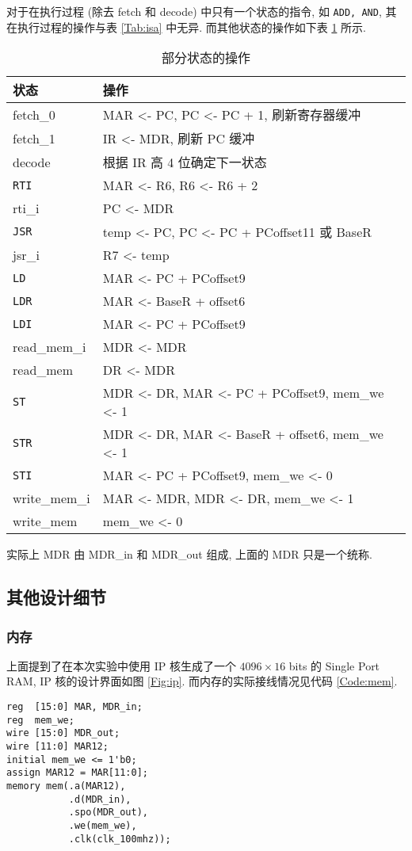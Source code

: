 \documentclass[UTF8,fontset=fandol]{ctexart}
\begin{document}
对于在执行过程 (除去 fetch 和 decode) 中只有一个状态的指令, 如 \texttt{ADD, AND}, 其在执行过程的操作与表 \ref{Tab:isa} 中无异.
而其他状态的操作如下表 \ref{Tab:op} 所示.
\begin{table}[!htbp]
  \centering
  \caption{部分状态的操作}
  \label{Tab:op}
  \begin{tabular}{ll}
    \toprule
    状态 & 操作 \\
    \midrule
    fetch\_0 & MAR <- PC, PC <- PC + 1, 刷新寄存器缓冲\\
    fetch\_1 & IR <- MDR, 刷新 PC 缓冲\\
    decode   & 根据 IR 高 4 位确定下一状态\\
    \texttt{RTI} & MAR <- R6, R6 <- R6 + 2\\
    rti\_i & PC <- MDR\\
    \texttt{JSR} & temp <- PC, PC <- PC + PCoffset11 或 BaseR\\
    jsr\_i & R7 <- temp\\
    \texttt{LD} & MAR <- PC + PCoffset9\\
    \texttt{LDR} & MAR <- BaseR + offset6\\
    \texttt{LDI} & MAR <- PC + PCoffset9\\
    read\_mem\_i & MDR <- MDR\\
    read\_mem & DR <- MDR\\
    \texttt{ST} & MDR <- DR, MAR <- PC + PCoffset9, mem\_we <- 1\\
    \texttt{STR} & MDR <- DR, MAR <- BaseR + offset6, mem\_we <- 1\\
    \texttt{STI} & MAR <- PC + PCoffset9, mem\_we <- 0\\
    write\_mem\_i & MAR <- MDR, MDR <- DR, mem\_we <- 1\\
    write\_mem & mem\_we <- 0\\
    \bottomrule
  \end{tabular}
\end{table}

实际上 MDR 由 MDR\_in 和 MDR\_out 组成, 上面的 MDR 只是一个统称.

\subsection*{其他设计细节}
\subsubsection*{内存}
上面提到了在本次实验中使用 IP 核生成了一个 $4096\times16$ bits 的 Single Port RAM, IP 核的设计界面如图 \ref{Fig:ip}. 而内存的实际接线情况见代码 \ref{Code:mem}.
\begin{lstlisting}[style = verilogstyle, caption = 内存的实际接线情况, label = Code:mem]
reg  [15:0] MAR, MDR_in;
reg  mem_we;
wire [15:0] MDR_out;
wire [11:0] MAR12;
initial mem_we <= 1'b0;
assign MAR12 = MAR[11:0];
memory mem(.a(MAR12), 
           .d(MDR_in), 
           .spo(MDR_out), 
           .we(mem_we), 
           .clk(clk_100mhz));
\end{lstlisting}
\end{document}
